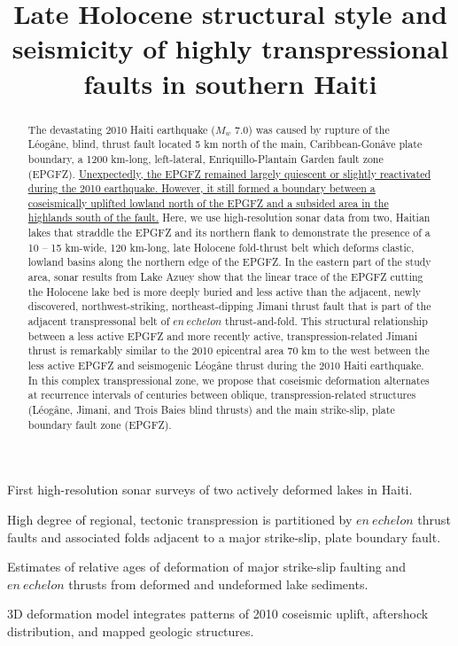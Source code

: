 \documentclass[linenumbers,draft]{agujournal}
\begin{document}
\title{Late Holocene structural style and seismicity of highly transpressional faults in southern Haiti}



\begin{keypoints}
\item First high-resolution sonar surveys of two actively deformed lakes in Haiti.
\item High degree of regional, tectonic transpression is partitioned by $en~echelon$ thrust faults and associated folds adjacent to a major strike-slip, plate boundary fault.
\item Estimates of relative ages of deformation of major strike-slip faulting and $en~echelon$ thrusts from deformed and undeformed lake sediments.
\item 3D deformation model integrates patterns of 2010 coseismic uplift, aftershock distribution, and mapped geologic structures.
\end{keypoints}

\begin{abstract}
The devastating 2010 Haiti earthquake ($M_w$ 7.0) was caused by rupture of the L\'eog\^ane, blind, thrust fault located 5 km north of the main, Caribbean-Gon\^ave plate boundary, a 1200 km-long, left-lateral, Enriquillo-Plantain Garden fault zone (EPGFZ). \ul{Unexpectedly, the EPGFZ remained largely quiescent or slightly reactivated during the 2010 earthquake. However, it still formed a boundary between a coseismically uplifted lowland north of the EPGFZ and a subsided area in the highlands south of the fault.} Here, we use high-resolution sonar data from two, Haitian lakes that straddle the EPGFZ and its northern flank to demonstrate the presence of a 10 -- 15 km-wide, 120 km-long, late Holocene fold-thrust belt which deforms clastic, lowland basins along the northern edge of the EPGFZ. In the eastern part of the study area, sonar results from Lake Azuey show that the linear trace of the EPGFZ cutting the Holocene lake bed is more deeply buried and less active than the adjacent, newly discovered, northwest-striking, northeast-dipping Jimani thrust fault that is part of the adjacent transpressonal belt of $en~echelon$ thrust-and-fold. This structural relationship between a less active EPGFZ and more recently active, transpression-related Jimani thrust is remarkably similar to the 2010 epicentral area 70 km to the west between the less active EPGFZ and seismogenic L\'eog\^ane thrust during the 2010 Haiti earthquake. In this complex transpressional zone, we propose that coseismic deformation alternates at recurrence intervals of centuries between oblique, transpression-related structures (L\'eog\^ane, Jimani, and Trois Baies blind thrusts) and the main strike-slip, plate boundary fault zone (EPGFZ).
\end{abstract}
\end{document}
